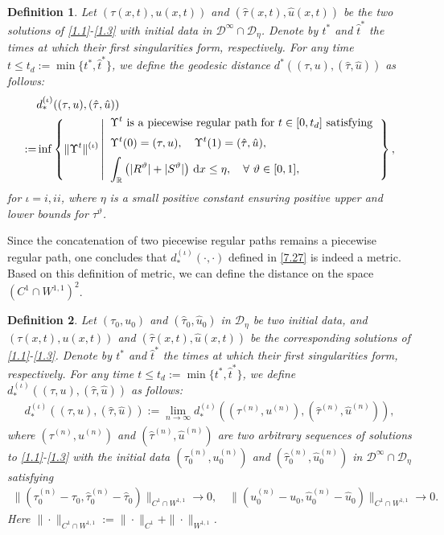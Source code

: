 \documentclass[11pt,reqno]{article}
\newtheorem{defn}{Definition}
\newcommand{\dps}{\displaystyle}
\numberwithin{equation}{section}
\begin{document}
\begin{defn}\label{def4}
Let $(\tau(x,t), u(x,t))$ and $(\hat{\tau}(x,t), \hat{u}(x,t))$ be the two solutions of \eqref{1.1}-\eqref{1.3} with initial data in $\mathcal{D}^\infty\cap \mathcal{D}_\eta$. Denote by $t^*$ and $\hat{t}^*$ the times at which their first singularities form, respectively. For any time $t\leq t_d:=\min\{t^*, \hat{t}^*\}$, we define the geodesic distance $d^*((\tau, u),(\hat{\tau}, \hat{u}))$ as follows:
\begin{align}\label{7.27}
&d_{*}^{(\iota)}((\tau, u),(\hat{\tau}, \hat{u})) \notag \\
:=&\inf\left\{ \|\Upsilon^t\|^{(\iota)}
\left|
\begin{array}{ll}
\dps \Upsilon^t\ {\rm is\ a\ piecewise\ regular\ path\ for}\ t\in[0,t_d]\ {\rm satisfying} \\[6pt]
\dps \Upsilon^t(0)=(\tau, u),\quad  \Upsilon^t(1)=(\hat{\tau}, \hat{u}), \\[6pt]
\dps \int_{\mathbb{R}}\big(|R^\vartheta|+|S^\vartheta|\big)\ {\rm d}x\leq \eta,\quad \forall\ \vartheta\in[0,1],
\end{array}
\right.
\right\},
\end{align}
for $\iota=i, ii$, where $\eta$ is a small positive constant ensuring positive upper and lower bounds for $\tau^\vartheta$.
\end{defn}

Since the concatenation of two piecewise regular paths remains a piecewise regular path, one concludes that $d_{*}^{(\iota)}(\cdot, \cdot)$ defined in \eqref{7.27} is indeed a metric. Based on this definition of metric, we can define the distance on the space $(C^1\cap W^{1,1})^2$.
\begin{defn}\label{def5}
Let $(\tau_0, u_0)$ and $(\hat{\tau}_0, \hat{u}_0)$ in $\mathcal{D}_\eta$ be two initial data, and $(\tau(x,t), u(x,t))$ and $(\hat{\tau}(x,t), \hat{u}(x,t))$ be the corresponding solutions of \eqref{1.1}-\eqref{1.3}. Denote by $t^*$ and $\hat{t}^*$ the times at which their first singularities form, respectively. For any time $t\leq t_d:=\min\{t^*, \hat{t}^*\}$, we define $d_{*}^{(\iota)}((\tau, u),(\hat{\tau}, \hat{u}))$ as follows:
\begin{align}\label{7.28}
d_{*}^{(\iota)}((\tau, u),(\hat{\tau}, \hat{u})) :=\lim_{n\rightarrow\infty}d_{*}^{(\iota)}((\tau^{(n)}, u^{(n)}),(\hat{\tau}^{(n)}, \hat{u}^{(n)})),
\end{align}
where $(\tau^{(n)}, u^{(n)})$ and $(\hat{\tau}^{(n)}, \hat{u}^{(n)})$ are two arbitrary sequences of solutions to \eqref{1.1}-\eqref{1.3} with the initial data $(\tau_{0}^{(n)}, u_{0}^{(n)})$ and $(\hat{\tau}_{0}^{(n)}, \hat{u}_{0}^{(n)})$ in $\mathcal{D}^\infty\cap \mathcal{D}_\eta$ satisfying
\begin{align}\label{7.29}
\|(\tau_{0}^{(n)}-\tau_0, \hat{\tau}_{0}^{(n)}-\hat{\tau}_0)\|_{C^1\cap W^{1,1}}\rightarrow0,\quad
\|(u_{0}^{(n)}-u_0, \hat{u}_{0}^{(n)}-\hat{u}_0)\|_{C^1\cap W^{1,1}}\rightarrow0.
\end{align}
Here $\|\cdot\|_{C^1\cap W^{1,1}}:= \|\cdot\|_{C^1}+\|\cdot\|_{W^{1,1}}$.
\end{defn}
\end{document}
